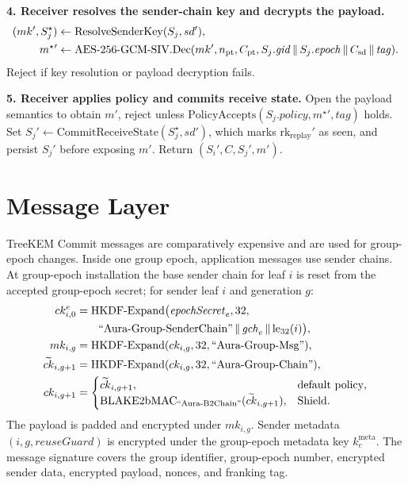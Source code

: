 \documentclass[preprint,12pt]{elsarticle}
\theoremstyle{definition}
\newcommand{\tech}[1]{\textnormal{#1}}
\newcommand{\domain}[1]{\textnormal{``#1''}}
\renewcommand{\mathsf}[1]{\mathrm{#1}}
\newcommand{\Shield}{\tech{Shield}}
\newcommand{\HKDF}{\tech{HKDF}}
\newcommand{\AEAD}{\tech{AES-256-GCM-SIV}}
\newcommand{\Dec}{\tech{Dec}}
\newcommand{\concat}{\,\|\,}
\newcommand{\gid}{\mathit{gid}}
\newcommand{\epoch}{\mathit{epoch}}
\newcommand{\gch}{\mathit{gch}}
\newcommand{\epochsec}{\mathit{epochSecret}}
\newcommand{\policy}{\mathit{policy}}
\begin{document}
\begin{algorithm}[!tbp]
\textbf{4. Receiver resolves the sender-chain key and decrypts the payload.}
\[
\begin{aligned}
(mk',S_j^\star)&\gets \mathrm{ResolveSenderKey}(S_j,sd'),\\
m^\star{}'&\gets
  \AEAD.\Dec(mk',n_{\mathsf{pt}},C_{\mathsf{pt}},
    S_j.\gid\concat S_j.\epoch\concat C_{\mathsf{sd}}\concat \mathit{tag}).
\end{aligned}
\]
Reject if key resolution or payload decryption fails.

\textbf{5. Receiver applies policy and commits receive state.}
Open the payload semantics to obtain $m'$, reject unless
$\mathrm{PolicyAccepts}(S_j.\policy,m^\star{}',\mathit{tag})$ holds. Set
$S_j'\gets \mathrm{CommitReceiveState}(S_j^\star,sd')$, which marks
$\mathsf{rk}_{\mathsf{replay}}'$ as seen, and persist $S_j'$ before exposing
$m'$.
Return $(S_i',C,S_j',m')$.
\end{algorithm}
\endgroup
\FloatBarrier

\section{Message Layer}

TreeKEM Commit messages are comparatively expensive and are used for group-epoch changes.
Inside one group epoch, application messages use sender chains. At group-epoch installation
the base sender chain for leaf $i$ is reset from the accepted group-epoch secret;
for sender leaf $i$ and generation $g$:
\begin{align}
  ck^e_{i,0} &=
  \HKDF\text{-}\mathrm{Expand}\bigl(\epochsec_e,32,\notag\\
  &\qquad \domain{Aura-Group-SenderChain}\concat \gch_e
    \concat \mathrm{le}_{32}(i)\bigr),
    \label{eq:sender-chain-reset}\\
  mk_{i,g} &= \HKDF\text{-}\mathrm{Expand}
    (ck_{i,g},32,\domain{Aura-Group-Msg}),\\
  \widetilde{ck}_{i,g+1} &= \HKDF\text{-}\mathrm{Expand}
    (ck_{i,g},32,\domain{Aura-Group-Chain}),\\
  ck_{i,g+1} &=
  \begin{cases}
    \widetilde{ck}_{i,g+1}, & \text{default policy},\\
    \mathrm{BLAKE2bMAC}_{\domain{Aura-B2Chain}}
      (\widetilde{ck}_{i,g+1}), & \Shield{}.
  \end{cases}
\end{align}
The payload is padded and encrypted under $mk_{i,g}$. Sender metadata
$(i,g,\mathit{reuseGuard})$ is encrypted under the group-epoch metadata key
$k^{\mathsf{meta}}_e$. The message signature covers the group identifier,
group-epoch number, encrypted sender data, encrypted payload, nonces, and franking tag.
\end{document}
